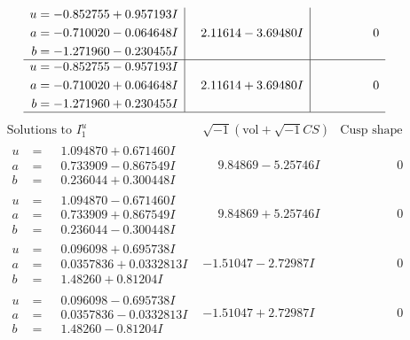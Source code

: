 \documentclass[1p]{elsarticle_modified}
\theoremstyle{definition}
\newcommand{\I}{\sqrt{-1}}
\begin{document}
$$\begin{array}{c|c|c}
\begin{aligned}
u &= -0.852755 + 0.957193 I \\
a &= -0.710020 - 0.064648 I \\
b &= -1.271960 - 0.230455 I\end{aligned}
 & \phantom{-}2.11614 - 3.69480 I & \phantom{-0.000000 } 0 \\ \hline\begin{aligned}
u &= -0.852755 - 0.957193 I \\
a &= -0.710020 + 0.064648 I \\
b &= -1.271960 + 0.230455 I\end{aligned}
 & \phantom{-}2.11614 + 3.69480 I & \phantom{-0.000000 } 0\\
 \hline 
 \end{array}$$\newpage$$\begin{array}{c|c|c}  
\text{Solutions to }I^u_{1}& \I (\text{vol} + \sqrt{-1}CS) & \text{Cusp shape}\\
 \hline 
\begin{aligned}
u &= \phantom{-}1.094870 + 0.671460 I \\
a &= \phantom{-}0.733909 - 0.867549 I \\
b &= \phantom{-}0.236044 + 0.300448 I\end{aligned}
 & \phantom{-}9.84869 - 5.25746 I & \phantom{-0.000000 } 0 \\ \hline\begin{aligned}
u &= \phantom{-}1.094870 - 0.671460 I \\
a &= \phantom{-}0.733909 + 0.867549 I \\
b &= \phantom{-}0.236044 - 0.300448 I\end{aligned}
 & \phantom{-}9.84869 + 5.25746 I & \phantom{-0.000000 } 0 \\ \hline\begin{aligned}
u &= \phantom{-}0.096098 + 0.695738 I \\
a &= \phantom{-}0.0357836 + 0.0332813 I \\
b &= \phantom{-}1.48260 + 0.81204 I\end{aligned}
 & -1.51047 - 2.72987 I & \phantom{-0.000000 } 0 \\ \hline\begin{aligned}
u &= \phantom{-}0.096098 - 0.695738 I \\
a &= \phantom{-}0.0357836 - 0.0332813 I \\
b &= \phantom{-}1.48260 - 0.81204 I\end{aligned}
 & -1.51047 + 2.72987 I & \phantom{-0.000000 } 0 \\ \hline\begin{aligned}

\end{aligned}
\end{array}$$
\end{document}
